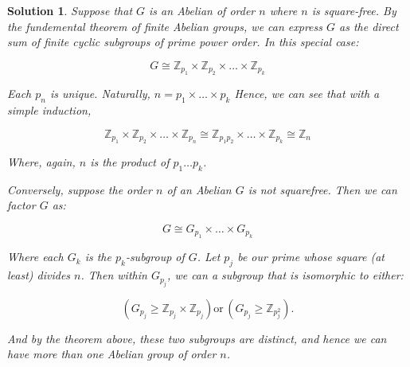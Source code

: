 \documentclass[12pt]{article}
\theoremstyle{moo}
\newtheorem*{sol}{Solution}
\def\zz{{\mathbb Z}}
\begin{document}
\begin{sol}
Suppose that $G$ is an Abelian of order $n$ where $n$ is square-free. By the fundemental theorem of finite Abelian groups, we can express $G$ as the direct sum of finite cyclic subgroups of prime power order. In this special case:

\[
G \cong \zz_{p_1} \times \zz_{p_2} \times \dots \times \zz_{p_k}
\]

Each $p_n$ is unique. Naturally, $n = p_1 \times \dots \times p_k$ Hence, we can see that with a simple induction,

\[
\zz_{p_1} \times \zz_{p_2} \times \dots \times \zz_{p_n} \cong \zz_{p_1p_2} \times \dots \times \zz_{p_k} \cong \zz_{n}
\]

Where, again, $n$ is the product of $p_1 \dots p_k$.

Conversely, suppose the order $n$ of an Abelian $G$ is not squarefree. Then we can factor $G$ as:

\[
G \cong G_{p_1} \times \dots \times G_{p_k}
\]

Where each $G_k$ is the $p_k$-subgroup of $G$. Let $p_j$ be our prime whose square (at least) divides $n$. Then within $G_{p_j}$, we can a subgroup that is isomorphic to either:

\[
\left( G_{p_j} \geq \zz_{p_j} \times \zz_{p_j} \right) \text{or} \, \left( G_{p_j} \geq \zz_{p^2_j} \right).
\]

And by the theorem above, these two subgroups are distinct, and hence we can have more than one Abelian group of order $n$.

\end{sol}
\end{document}
